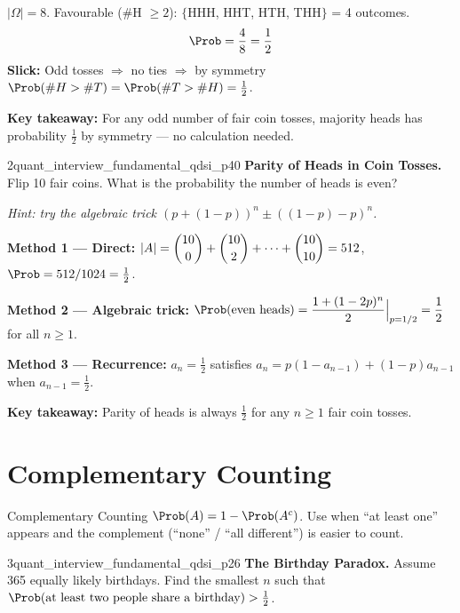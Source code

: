 \documentclass[11pt]{article}
\begin{document}
\begin{solutionbox}
$|\Omega|=8$. Favourable (\#H $\geq 2$): $\{$HHH, HHT, HTH, THH$\}$ = 4 outcomes.
\[
  \Prob = \frac{4}{8} = \frac{1}{2}
\]
\textbf{Slick:} Odd tosses $\Rightarrow$ no ties $\Rightarrow$ by symmetry
$\Prob(\#H>\#T)=\Prob(\#T>\#H)=\tfrac{1}{2}$.

\textbf{Key takeaway:} For any odd number of fair coin tosses, majority heads has
probability $\tfrac{1}{2}$ by symmetry — no calculation needed.
\end{solutionbox}

\begin{freeproblem}{2}{\freelabel}{}{quant\_interview\_fundamental\_qdsi\_p40}
\textbf{Parity of Heads in Coin Tosses.}
Flip 10 fair coins. What is the probability the number of heads is even?

\textit{Hint: try the algebraic trick $(p+(1-p))^n \pm ((1-p)-p)^n$.}
\end{freeproblem}

\begin{solutionbox}
\textbf{Method 1 — Direct:}
$|A|=\dbinom{10}{0}+\dbinom{10}{2}+\cdots+\dbinom{10}{10}=512$,
$\Prob=512/1024=\tfrac{1}{2}$.

\textbf{Method 2 — Algebraic trick:}
$\Prob(\text{even heads}) = \dfrac{1+(1-2p)^n}{2}\Big|_{p=1/2} = \dfrac{1}{2}$ for all $n\geq1$.

\textbf{Method 3 — Recurrence:}
$a_n = \tfrac{1}{2}$ satisfies $a_n = p(1-a_{n-1})+(1-p)a_{n-1}$ when $a_{n-1}=\tfrac{1}{2}$.

\textbf{Key takeaway:} Parity of heads is always $\tfrac{1}{2}$ for any $n\geq1$ fair coin tosses.
\end{solutionbox}

\section{Complementary Counting}

\begin{techniquebox}{Complementary Counting}
$\Prob(A)=1-\Prob(A^c)$. Use when ``at least one'' appears and the complement
(``none'' / ``all different'') is easier to count.
\end{techniquebox}

\begin{freeproblem}{3}{\freelabel}{}{quant\_interview\_fundamental\_qdsi\_p26}
\textbf{The Birthday Paradox.}
Assume 365 equally likely birthdays. Find the smallest $n$ such that
$\Prob(\text{at least two people share a birthday})>\tfrac{1}{2}$.
\end{freeproblem}
\end{document}
